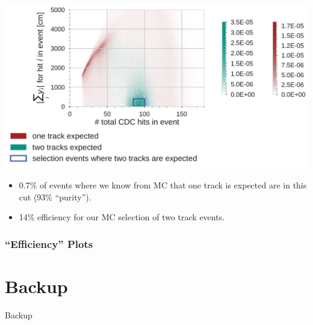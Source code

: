 \documentclass[18pt]{beamer}
\begin{document}
\begin{frame}
  \begin{center}
    \includegraphics[width=1.0\textwidth]{figures/mcsplit_analysis/sum_y_vs_hits_merged.pdf}
  \end{center}
  \begin{itemize}
  \item 0.7\% of events where we know from MC that one track is expected are in this cut (93\% ``purity'').\\
  \item 14\% efficiency for our MC selection of two track events.
  \end{itemize}
\end{frame}

\begin{frame}
  \frametitle{``Efficiency'' Plots}
  
\end{frame}


\section{Backup}
\backupbegin

\begin{frame}
  \begin{center}
    \huge Backup
  \end{center}
\end{frame}
\end{document}

